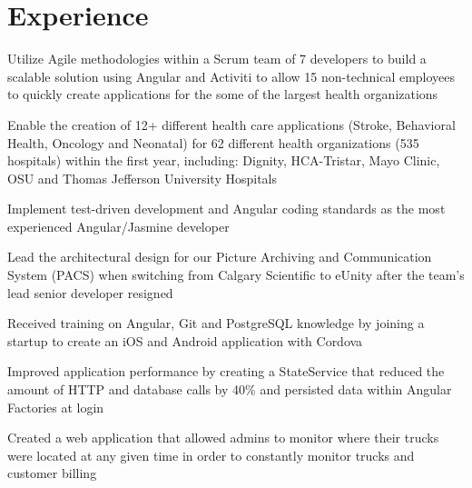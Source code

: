 \documentclass[]{deedy-resume-openfont}
\begin{document}
\hfill
\begin{minipage}[t]{0.66\textwidth}


\section{Experience}

\vspace{\topsep}
\begin{tightemize}\item Utilize Agile methodologies within a Scrum team of 7 developers to build a scalable solution using Angular and Activiti to allow 15 non-technical employees to quickly create applications for the some of the largest health organizations
\item Enable the creation of 12+ different health care applications (Stroke, Behavioral Health, Oncology and Neonatal) for 62 different health organizations (535 hospitals) within the first year, including: Dignity, HCA-Tristar, Mayo Clinic, OSU and Thomas Jefferson University Hospitals
\item Implement test-driven development and Angular coding standards as the most experienced Angular/Jasmine developer
\item Lead the architectural design for our Picture Archiving and Communication System (PACS) when switching from Calgary Scientific to eUnity after the team's lead senior developer resigned
\end{tightemize}
\sectionsep

\vspace{\topsep}
\begin{tightemize}\item Received training on Angular, Git and PostgreSQL knowledge by joining a startup to create an iOS and Android application with Cordova
\item Improved application performance by creating a StateService that reduced the amount of HTTP and database calls by 40\% and persisted data within Angular Factories at login
\item Created a web application that allowed admins to monitor where their trucks were located at any given time in order to constantly monitor trucks and customer billing
\end{tightemize}
\sectionsep


\end{minipage}
\end{document}
